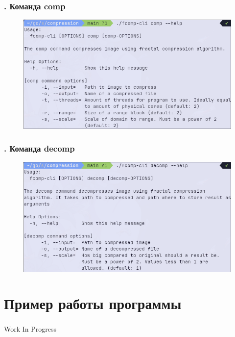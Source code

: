 \documentclass[t aspectratio=169]{beamer}
\begin{document}
  \begin{frame}\frametitle{\insertsection. Команда comp}
   \begin{figure}
    \begin{center}
      \includegraphics[width=\textwidth]{./images/cli-comp.png}
    \end{center}
   \end{figure}
  \end{frame}

  \begin{frame}\frametitle{\insertsection. Команда decomp}
   \begin{figure}
    \begin{center}
      \includegraphics[width=\textwidth]{./images/cli-decomp.png}
    \end{center}
   \end{figure}
  \end{frame}

  \section{Пример работы программы}
  \begin{frame}\frametitle{\insertsection}
    Work In Progress
  \end{frame}
\end{document}
